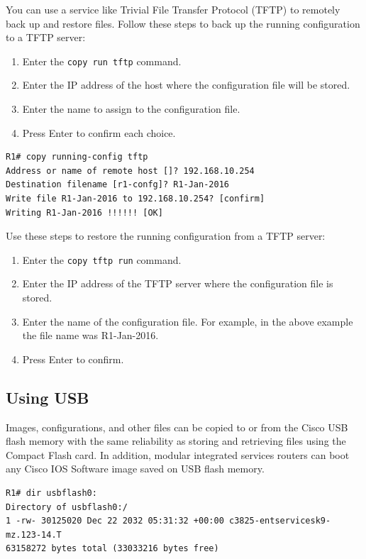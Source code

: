 You can use a service like Trivial File Transfer Protocol (TFTP) to remotely back up and restore files. Follow these steps to back up the running configuration to a TFTP server:

\begin{enumerate}
\item Enter the \verb|copy run tftp| command.
\item Enter the IP address of the host where the configuration file will be stored.
\item Enter the name to assign to the configuration file.
\item Press Enter to confirm each choice.
\end{enumerate}

\begin{verbatim}
R1# copy running-config tftp
Address or name of remote host []? 192.168.10.254
Destination filename [r1-confg]? R1-Jan-2016
Write file R1-Jan-2016 to 192.168.10.254? [confirm]
Writing R1-Jan-2016 !!!!!! [OK]
\end{verbatim}

Use these steps to restore the running configuration from a TFTP server:

\begin{enumerate}
\item Enter the \verb|copy tftp run| command.
\item Enter the IP address of the TFTP server where the configuration file is stored.
\item Enter the name of the configuration file. For example, in the above example the file name was R1-Jan-2016.
\item Press Enter to confirm.
\end{enumerate}

\subsection{Using USB}

Images, configurations, and other files can be copied to or from the Cisco USB flash memory with the same reliability as storing and retrieving files using the Compact Flash card. In addition, modular integrated services routers can boot any Cisco IOS Software image saved on USB flash memory. 

\begin{verbatim}
R1# dir usbflash0:
Directory of usbflash0:/
1 -rw- 30125020 Dec 22 2032 05:31:32 +00:00 c3825-entservicesk9-mz.123-14.T
63158272 bytes total (33033216 bytes free)
\end{verbatim}

